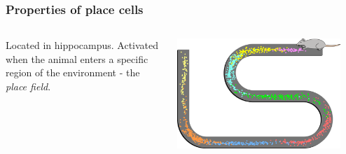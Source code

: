\documentclass[mathserif]{beamer}
\begin{document}
%
%
%
\begin{frame}
\frametitle{Properties of place cells}
  \begin{columns}[T]
    \begin{column}{.5\textwidth}
			Located in hippocampus. Activated when the animal enters a specific region of the environment - the \textit{place field}.
    \end{column}
    \begin{column}{.5\textwidth}
    \includegraphics[width=0.9\textwidth]{Place_Cell_Spiking_Activity_Example.png}
    \end{column}
  \end{columns}	
\end{frame}
%
%
%
\end{document}
